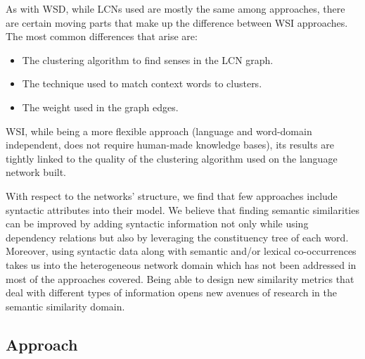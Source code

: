 As with WSD, while  LCNs used are mostly the same among approaches, there are certain moving parts that make up the difference between WSI approaches. The most common differences that   arise are:

\begin{itemize}
\item The clustering algorithm to find senses in the LCN graph.
\item The technique used to match context words to clusters.
\item The weight used in the graph edges.
\end{itemize}


WSI, while being a more flexible approach (language and word-domain independent, does not require human-made knowledge bases), its results are tightly linked to the quality of the clustering algorithm used on the language network built. 
%



With respect to the networks' structure, we find that few approaches include syntactic attributes into their model. We believe that finding semantic similarities can be improved by adding syntactic information not only  while using dependency relations but also by leveraging the constituency tree of each word. Moreover, using syntactic data along with semantic and/or lexical co-occurrences takes us into the heterogeneous network domain which has not been addressed in most of the approaches covered.
Being able to design new similarity metrics that deal with different types of information opens new avenues of research in the semantic similarity domain. %




\subsection{Approach}
	


